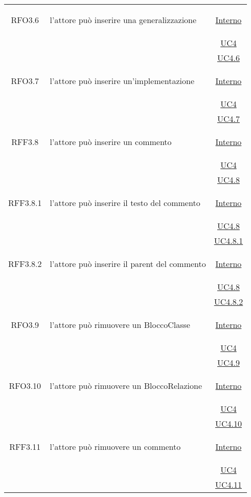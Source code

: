 \begin{longtable}{|c|>{\centering}m{7cm}|c|}
\hypertarget{RFO3.6}{RFO3.6} & l'attore può inserire una generalizzazione &  \hyperlink{Interno}{Interno}\\
& &\hyperref[UC4]{UC4}\\
& &\hyperref[UC4.6]{UC4.6}\\ \hline

\hypertarget{RFO3.7}{RFO3.7} & l'attore può inserire un'implementazione &  \hyperlink{Interno}{Interno}\\
& &\hyperref[UC4]{UC4}\\
& &\hyperref[UC4.7]{UC4.7}\\ \hline

\hypertarget{RFF3.8}{RFF3.8} & l'attore può inserire un commento &  \hyperlink{Interno}{Interno}\\
& &\hyperref[UC4]{UC4}\\
& &\hyperref[UC4.8]{UC4.8}\\ \hline

\hypertarget{RFF3.8.1}{RFF3.8.1} & l'attore può inserire il testo del commento &  \hyperlink{Interno}{Interno}\\
& &\hyperref[UC4.8]{UC4.8}\\
& &\hyperref[UC4.8.1]{UC4.8.1}\\ \hline

\hypertarget{RFF3.8.2}{RFF3.8.2} & l'attore può inserire il parent del commento &  \hyperlink{Interno}{Interno}\\
& &\hyperref[UC4.8]{UC4.8}\\
& &\hyperref[UC4.8.2]{UC4.8.2}\\ \hline

\hypertarget{RFO3.9}{RFO3.9} & l'attore può rimuovere un BloccoClasse &  \hyperlink{Interno}{Interno}\\
& &\hyperref[UC4]{UC4}\\
& &\hyperref[UC4.9]{UC4.9}\\ \hline

\hypertarget{RFO3.10}{RFO3.10} & l'attore può rimuovere un BloccoRelazione &  \hyperlink{Interno}{Interno}\\
& &\hyperref[UC4]{UC4}\\
& &\hyperref[UC4.10]{UC4.10}\\ \hline

\hypertarget{RFF3.11}{RFF3.11} & l'attore può rimuovere un commento &  \hyperlink{Interno}{Interno}\\
& &\hyperref[UC4]{UC4}\\
& &\hyperref[UC4.11]{UC4.11}\\ \hline


\end{longtable}
